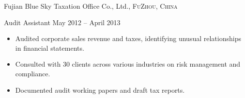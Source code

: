 \documentclass[10pt,a4paper]{article}
\begin{document}
\headedsection
{Fujian Blue Sky Taxation Office Co., Ltd.,}
{{\small \textsc{FuZhou, China}}}
{
  \headedsubsection
  {Audit Assistant}
  {May 2012 – April 2013}
  {
    \begin{itemize}
      \item Audited corporate sales revenue and taxes, identifying unusual relationships in financial statements.
      \item Consulted with 30 clients across various industries on risk management and compliance.
      \item Documented audit working papers and draft tax reports.
    \end{itemize}
  }
}




\end{document}
